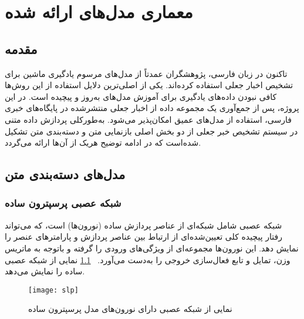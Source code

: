 \chapter{معماری مدل‌های ارائه شده}
\section{مقدمه}
تاکنون در زبان فارسی، پژوهشگران عمدتاً از مدل‌های مرسوم یادگیری ماشین برای تشخیص اخبار جعلی استفاده کرده‌اند. یکی از اصلی‌ترین دلایل استفاده از این روش‌ها کافی نبودن داده‌های یادگیری برای آموزش مدل‌های به‌روز و پیچیده است. در این پروژه، پس از جمع‌آوری یک مجموعه داده از اخبار جعلی منتشرشده در پایگاه‌های خبری فارسی، استفاده از مدل‌های عمیق امکان‌پذیر می‌شود. به‌طورکلی پردازش داده متنی در سیستم تشخیص خبر جعلی‌ از دو بخش اصلی بازنمایی متن و دسته‌بندی متن تشکیل شده‌است که در ادامه توضیح هریک از آن‌ها ارائه می‌گردد.
\section{مدل‌های دسته‌بندی متن}
\subsection{شبکه عصبی پرسپترون ساده}
شبکه عصبی شامل شبکه‌ای از عناصر پردازش ساده (نورون‌ها) است، که می‌تواند رفتار پیچیده کلی تعیین‌شده‌ای از ارتباط بین عناصر پردازش و پارامترهای عنصر را نمایش دهد. این نورون‌ها مجموعه‌ای از ویژگی‌های ورودی را گرفته و باتوجه‌ به ماتریس وزن، تمایل و تابع فعال‌سازی خروجی را به‌دست می‌آورد. \figurename~\ref{fig.slp} نمایی از شبکه عصبی ساده را نمایش می‌دهد.

\begin{figure}[!h]
\texttt{[image: slp]}
\centering
\caption{نمایی از شبکه عصبی دارای نورون‌های مدل پرسپترون ساده}
\label{fig.slp}
\end{figure}

